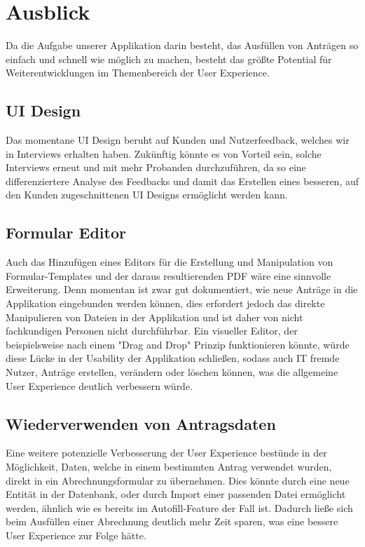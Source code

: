 \chapter{Ausblick}\label{ch:ausblick}

Da die Aufgabe unserer Applikation darin besteht, das Ausfüllen von Anträgen so einfach 
und schnell wie möglich zu machen, besteht das größte Potential für Weiterentwicklungen
im Themenbereich der User Experience.

\section{\ac{UI} Design}\label{sec: ui design}
Das momentane \ac{UI} Design beruht auf Kunden und Nutzerfeedback, welches wir in
Interviews erhalten haben. Zukünftig könnte es von Vorteil sein, solche Interviews
erneut und mit mehr Probanden durchzuführen, da so eine differenziertere Analyse
des Feedbacks und damit das Erstellen eines besseren, auf den Kunden zugeschnittenen \ac{UI}
Designs ermöglicht werden kann.

\section{Formular Editor}\label{sec: formular editor}
Auch das Hinzufügen eines Editors für die Erstellung und Manipulation von 
Formular-Templates und der daraus resultierenden \ac{PDF} wäre eine sinnvolle Erweiterung. Denn
momentan ist zwar gut dokumentiert, wie neue Anträge in die Applikation eingebunden werden 
können, dies erfordert jedoch das direkte Manipulieren von Dateien in der Applikation 
und ist daher von nicht fachkundigen Personen nicht durchführbar. Ein visueller Editor, der 
beispielsweise nach einem "Drag and Drop" Prinzip funktionieren könnte, würde diese Lücke 
in der Usability der Applikation schließen, sodass auch IT fremde Nutzer, Anträge 
erstellen, verändern oder löschen können, was die allgemeine User Experience deutlich 
verbessern würde.

\section{Wiederverwenden von Antragsdaten}\label{sec: wiederverwenden von Antragsdaten}
Eine weitere potenzielle Verbesserung der User Experience bestünde in der Möglichkeit, 
Daten, welche in einem bestimmten Antrag verwendet wurden, direkt in ein 
Abrechnungsformular zu übernehmen. Dies könnte durch eine neue Entität in der Datenbank, 
oder durch Import einer passenden Datei ermöglicht werden, ähnlich wie es bereits im 
Autofill-Feature der Fall ist. Dadurch ließe sich beim Ausfüllen einer Abrechnung deutlich 
mehr Zeit sparen, was eine bessere User Experience zur Folge hätte.

